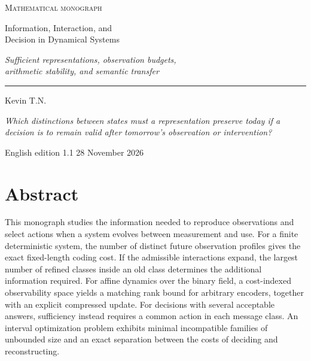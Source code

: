 \documentclass[11pt,a4paper]{article}
\theoremstyle{definition}
\begin{document}
\begin{titlepage}\thispagestyle{empty}
\setlength{\parindent}{0pt}
\vspace*{18mm}
{\small\scshape Mathematical monograph\par}
\vspace{9mm}
{\fontsize{32}{36}\selectfont Information, Interaction, and\\[2pt] Decision in Dynamical Systems\par}
\vspace{6mm}
{\Large\itshape Sufficient representations, observation budgets,\\ arithmetic stability, and semantic transfer\par}
\vspace{9mm}\noindent\rule{0.27\linewidth}{0.5pt}\par
\vspace{10mm}
{\Large Kevin T.N.\par}\vspace{1.5mm}{\normalsize Epistemologist\par}
\vfill
\begin{minipage}{.87\linewidth}
\textit{Which distinctions between states must a representation preserve today if a decision is to remain valid after tomorrow's observation or intervention?}
\end{minipage}
\vspace{14mm}

\noindent English edition 1.1 \hfill 28 November 2026
\end{titlepage}
\section*{Abstract}
This monograph studies the information needed to reproduce observations and select actions when a system evolves between measurement and use. For a finite deterministic system, the number of distinct future observation profiles gives the exact fixed-length coding cost. If the admissible interactions expand, the largest number of refined classes inside an old class determines the additional information required. For affine dynamics over the binary field, a cost-indexed observability space yields a matching rank bound for arbitrary encoders, together with an explicit compressed update. For decisions with several acceptable answers, sufficiency instead requires a common action in each message class. An interval optimization problem exhibits minimal incompatible families of unbounded size and an exact separation between the costs of deciding and reconstructing.
\end{document}
